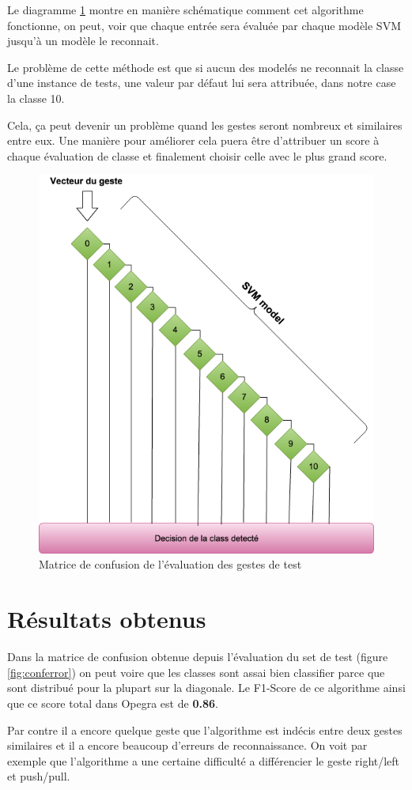 Le diagramme \ref{fig:models-svm} montre en manière schématique comment cet algorithme fonctionne, on peut, voir que chaque entrée sera évaluée par chaque modèle SVM jusqu'à un modèle le reconnait.

Le problème de cette méthode est que si aucun des modelés ne reconnait la classe d'une instance de tests, une valeur par défaut lui sera attribuée, dans notre case la classe 10.

Cela, ça peut devenir un problème quand les gestes seront nombreux et similaires entre eux. Une manière pour améliorer cela puera être d'attribuer un score à chaque évaluation de classe et finalement choisir celle avec le plus grand score.


\begin{figure}[h]
  \centering
    \includegraphics[width=0.7\linewidth]{img/evaluation/svm-class.png}
  \caption{Matrice de confusion de l'évaluation des gestes de test}
  \label{fig:models-svm}
\end{figure}


\section*{Résultats obtenus}
Dans la matrice de confusion obtenue depuis l'évaluation du set de test  (figure \ref{fig:conferror})  on peut voire que les classes sont assai bien classifier parce que sont distribué pour la plupart sur la diagonale. Le F1-Score de ce algorithme ainsi que ce score total dans Opegra est de \textbf{0.86}.

Par contre il a encore quelque geste que l'algorithme est indécis entre deux gestes similaires et il a encore beaucoup d'erreurs de reconnaissance. On voit par exemple que l'algorithme a une certaine difficulté a différencier le geste right/left et push/pull.

